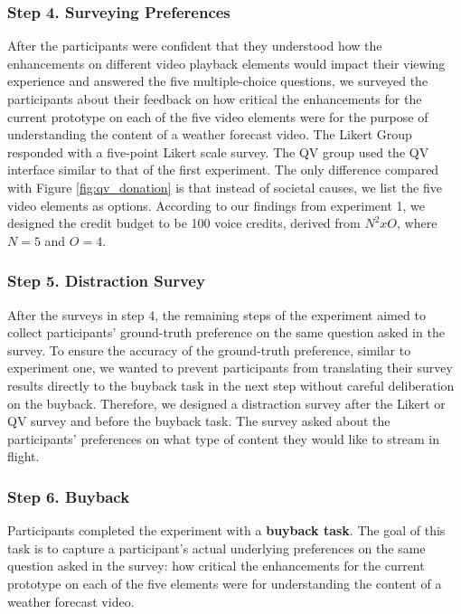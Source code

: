 \subsubsection{Step 4. Surveying Preferences}
After the participants were confident that they understood how the enhancements on different video playback elements would impact their viewing experience and answered the five multiple-choice questions, we surveyed the participants about their feedback on how critical the enhancements for the current prototype on each of the five video elements were for the purpose of understanding the content of a weather forecast video. The Likert Group responded with a five-point Likert scale survey. The QV group used the QV interface similar to that of the first experiment. The only difference compared with Figure \ref{fig:qv_donation} is that instead of societal causes, we list the five video elements as options. According to our findings from experiment 1, we designed the credit budget to be 100 voice credits, derived from $N^2 x O$, where $N=5$ and $O=4$.


\subsubsection{Step 5. Distraction Survey}
After the surveys in step 4, the remaining steps of the experiment aimed to collect participants' ground-truth preference on the same question asked in the survey. 
To ensure the accuracy of the ground-truth preference, similar to experiment one, we wanted to prevent participants from translating their survey results directly to the buyback task in the next step without careful deliberation on the buyback. Therefore, we designed a distraction survey after the Likert or QV survey and before the buyback task. The survey asked about the participants' preferences on what type of content they would like to stream in flight.


\subsubsection{Step 6. Buyback}
Participants completed the experiment with a \textbf{buyback task}. The goal of this task is to capture a participant's actual underlying preferences on the same question asked in the survey: how critical the enhancements for the current prototype on each of the five elements were for understanding the content of a weather forecast video. 

